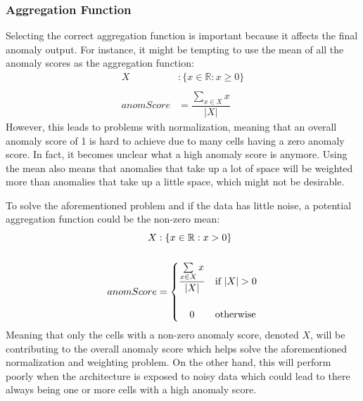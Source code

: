 \subsubsection{Aggregation Function}
Selecting the correct aggregation function is important because it affects the final anomaly output. For instance, it might be tempting to use the mean of all the anomaly scores as the aggregation function:
\begin{align*}
    X         & :\{x \in \mathbb{R} : x \geq 0\}     \\
    \\
    anomScore & =\dfrac{\sum\limits_{x \in X}x}{|X|}
\end{align*}
However, this leads to problems with normalization, meaning that an overall anomaly score of 1 is hard to achieve due to many cells having a zero anomaly score. In fact, it becomes unclear what a high anomaly score is anymore. Using the mean also means that anomalies that take up a lot of space will be weighted more than anomalies that take up a little space, which might not be desirable.
\par
To solve the aforementioned problem and if the data has little noise, a potential aggregation function could be the non-zero mean:
\begin{align*}
    X         & :\{x \in \mathbb{R} : x > 0\} \\
    \\
    anomScore & =
    \begin{cases}
        \dfrac{\sum\limits_{x \in X}x}{|X|} & \text{if } |X| > 0 \\
        \\
        \hfil 0                             & \text{otherwise}
    \end{cases}
\end{align*}
Meaning that only the cells with a non-zero anomaly score, denoted $X$, will be contributing to the overall anomaly score which helps solve the aforementioned normalization and weighting problem. On the other hand, this will perform poorly when the architecture is exposed to noisy data which could lead to there always being one or more cells with a high anomaly score.
